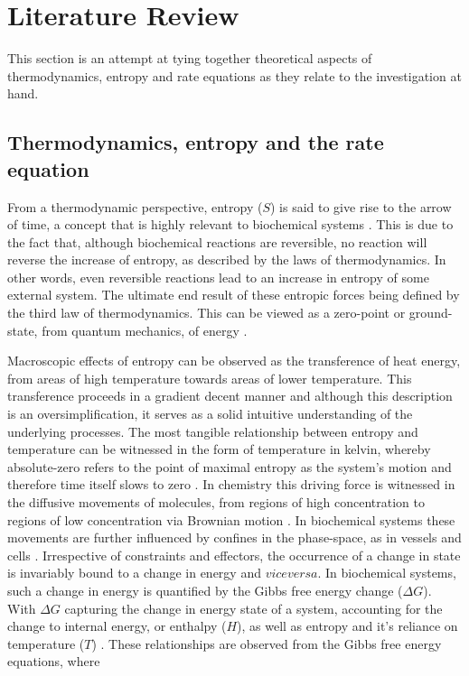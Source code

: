 \chapter{Literature Review} \label{chp:2}
This section is an attempt at tying together theoretical aspects of thermodynamics, entropy and rate equations as they relate to the investigation at hand. 

\section{Thermodynamics, entropy and the rate equation}\label{Entropy}
From a thermodynamic perspective, entropy ($S$) is said to give rise to the arrow of time, a concept that is highly relevant to biochemical systems \cite{Lebowitz1994}. This is due to the fact that, although biochemical reactions are reversible, no reaction will reverse the increase of entropy, as described by the laws of thermodynamics. In other words, even reversible reactions lead to an increase in entropy of some external system. The ultimate end result of these entropic forces being defined by the third law of thermodynamics. This can be viewed as a zero-point or ground-state, from quantum mechanics, of energy \cite{Vidal2002}. 

Macroscopic effects of entropy can be observed as the transference of heat energy, from areas of high temperature towards areas of lower temperature. This transference proceeds in a gradient decent manner and although this description is an oversimplification, it serves as a solid intuitive understanding of the underlying processes. The most tangible relationship between entropy and temperature can be witnessed in the form of temperature in kelvin, whereby absolute-zero refers to the point of maximal entropy as the system's motion and therefore time itself slows to zero \cite{Wickramasinghe2004}. In chemistry this driving force is witnessed in the diffusive movements of molecules, from regions of high concentration to regions of low concentration via Brownian motion \cite{Roos2014}. In biochemical systems these movements are further influenced by confines in the phase-space, as in vessels and cells \cite{Kramers1940, Burada2009}. Irrespective of constraints and effectors, the occurrence of a change in state is invariably bound to a change in energy and $vice versa$. In biochemical systems, such a change in energy is quantified by the Gibbs free energy change ($\Delta G$). With $\Delta G$ capturing the change in energy state of a system, accounting for the change to internal energy, or enthalpy ($H$), as well as entropy and it's reliance on temperature ($T$) \cite{Job2016, LEFFLER1955}. These relationships are observed from the Gibbs free energy equations, where

